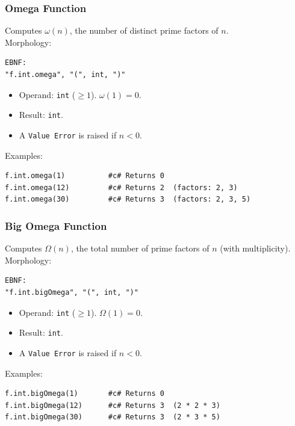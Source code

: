 \subsubsection{Omega Function}
Computes $\omega(n)$, the number of distinct prime factors of $n$. \\
Morphology:
\begin{verbatim}
EBNF:
"f.int.omega", "(", int, ")"
\end{verbatim}
\begin{itemize}
\item Operand: \texttt{int} ($\geq 1$). $\omega(1) = 0$.
\item Result: \texttt{int}.
\item A \texttt{Value Error} is raised if $n < 0$.
\end{itemize}
Examples:
\begin{verbatim}
f.int.omega(1)          #c# Returns 0
f.int.omega(12)         #c# Returns 2  (factors: 2, 3)
f.int.omega(30)         #c# Returns 3  (factors: 2, 3, 5)
\end{verbatim}

\subsubsection{Big Omega Function}
Computes $\Omega(n)$, the total number of prime factors of $n$ (with multiplicity). \\
Morphology:
\begin{verbatim}
EBNF:
"f.int.bigOmega", "(", int, ")"
\end{verbatim}
\begin{itemize}
\item Operand: \texttt{int} ($\geq 1$). $\Omega(1) = 0$.
\item Result: \texttt{int}.
\item A \texttt{Value Error} is raised if $n < 0$.
\end{itemize}
Examples:
\begin{verbatim}
f.int.bigOmega(1)       #c# Returns 0
f.int.bigOmega(12)      #c# Returns 3  (2 * 2 * 3)
f.int.bigOmega(30)      #c# Returns 3  (2 * 3 * 5)
\end{verbatim}

